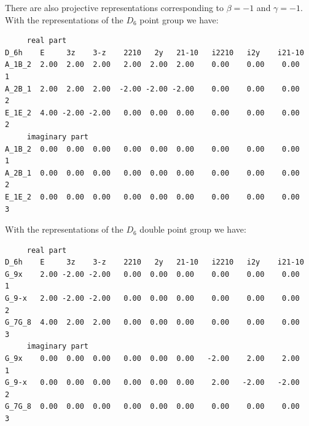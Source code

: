 \documentclass[12pt,a4paper]{article}
\begin{document}
There are also projective representations corresponding to $\beta=-1$ 
and $\gamma=-1$. With the representations of the $D_6$ point group we have:  
\begin{verbatim}
     real part
D_6h    E     3z    3-z    2210   2y   21-10   i2210   i2y    i21-10
A_1B_2  2.00  2.00  2.00   2.00  2.00  2.00    0.00    0.00    0.00     1
A_2B_1  2.00  2.00  2.00  -2.00 -2.00 -2.00    0.00    0.00    0.00     2
E_1E_2  4.00 -2.00 -2.00   0.00  0.00  0.00    0.00    0.00    0.00     2
     imaginary part
A_1B_2  0.00  0.00  0.00   0.00  0.00  0.00    0.00    0.00    0.00     1
A_2B_1  0.00  0.00  0.00   0.00  0.00  0.00    0.00    0.00    0.00     2
E_1E_2  0.00  0.00  0.00   0.00  0.00  0.00    0.00    0.00    0.00     3
\end{verbatim}
With the representations of the $D_6$ double point group we have:
\begin{verbatim}
     real part
D_6h    E     3z    3-z    2210   2y   21-10   i2210   i2y    i21-10
G_9x    2.00 -2.00 -2.00   0.00  0.00  0.00    0.00    0.00    0.00     1
G_9-x   2.00 -2.00 -2.00   0.00  0.00  0.00    0.00    0.00    0.00     2
G_7G_8  4.00  2.00  2.00   0.00  0.00  0.00    0.00    0.00    0.00     3
     imaginary part
G_9x    0.00  0.00  0.00   0.00  0.00  0.00   -2.00    2.00    2.00     1
G_9-x   0.00  0.00  0.00   0.00  0.00  0.00    2.00   -2.00   -2.00     2
G_7G_8  0.00  0.00  0.00   0.00  0.00  0.00    0.00    0.00    0.00     3
\end{verbatim}

\newpage
\end{document}
